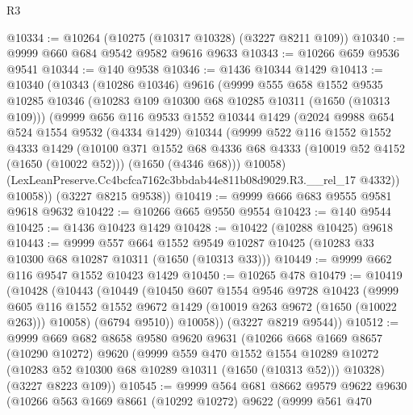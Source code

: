 \begin{lexlean}{R3}
\begin{coremodule}
@10334 := @10264 (@10275 (@10317 @10328) (@3227 @8211 @109))
@10340 := @9999 @660 @684 @9542 @9582 @9616 @9633
@10343 := @10266 @659 @9536 @9541
@10344 := @140 @9538
@10346 := @1436 @10344 @1429
@10413 := @10340
    (@10343
      (@10286 @10346)
      @9616
      (@9999
        @555
        @658
        @1552
        @9535
        @10285
        @10346
        (@10283 @109 @10300 @68 @10285 @10311 (@1650 (@10313 @109)))
        (@9999
          @656
          @116
          @9533
          @1552
          @10344
          @1429
          (@2024
            @9988
            @654
            @524
            @1554
            @9532
            (@4334 @1429)
            @10344
            (@9999
              @522
              @116
              @1552
              @1552
              @4333
              @1429
              (@10100
                @371
                @1552
                @68
                @4336
                @68
                @4333
                (@10019 @52 @4152 (@1650 (@10022 @52)))
                (@1650 (@4346 @68)))
              @10058)
            (LexLeanPreserve.Cc4bcfca7162c3bbdab44e811b08d9029.R3.__rel_17 @4332))
          @10058))
      (@3227 @8215 @9538))
@10419 := @9999 @666 @683 @9555 @9581 @9618 @9632
@10422 := @10266 @665 @9550 @9554
@10423 := @140 @9544
@10425 := @1436 @10423 @1429
@10428 := @10422 (@10288 @10425) @9618
@10443 := @9999
    @557
    @664
    @1552
    @9549
    @10287
    @10425
    (@10283 @33 @10300 @68 @10287 @10311 (@1650 (@10313 @33)))
@10449 := @9999 @662 @116 @9547 @1552 @10423 @1429
@10450 := @10265 @478
@10479 := @10419
    (@10428
      (@10443
        (@10449
          (@10450
            @607
            @1554
            @9546
            @9728
            @10423
            (@9999
              @605
              @116
              @1552
              @1552
              @9672
              @1429
              (@10019 @263 @9672 (@1650 (@10022 @263)))
              @10058)
            (@6794 @9510))
          @10058))
      (@3227 @8219 @9544))
@10512 := @9999
    @669
    @682
    @8658
    @9580
    @9620
    @9631
    (@10266
      @668
      @1669
      @8657
      (@10290 @10272)
      @9620
      (@9999
        @559
        @470
        @1552
        @1554
        @10289
        @10272
        (@10283 @52 @10300 @68 @10289 @10311 (@1650 (@10313 @52)))
        @10328)
      (@3227 @8223 @109))
@10545 := @9999
    @564
    @681
    @8662
    @9579
    @9622
    @9630
    (@10266
      @563
      @1669
      @8661
      (@10292 @10272)
      @9622
      (@9999
        @561
        @470

\end{coremodule}
\end{lexlean}
